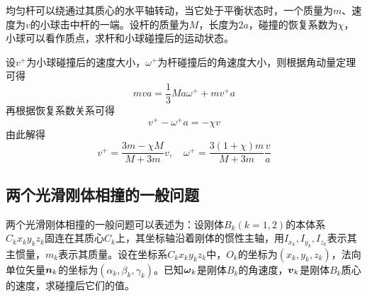 \begin{example}
均匀杆可以绕通过其质心的水平轴转动，当它处于平衡状态时，一个质量为$m$、速度为$v$的小球击中杆的一端。设杆的质量为$M$，长度为$2a$，碰撞的恢复系数为$\chi$，小球可以看作质点，求杆和小球碰撞后的运动状态。
\end{example}
\begin{solution}
设$v^+$为小球碰撞后的速度大小，$\omega^+$为杆碰撞后的角速度大小，则根据角动量定理可得
\begin{equation*}
	mva = \dfrac13Ma\omega^++mv^+a
\end{equation*}
再根据恢复系数关系可得
\begin{equation*}
	v^+-\omega^+a=-\chi v
\end{equation*}
由此解得
\begin{equation*}
	v^+ = \frac{3m-\chi M}{M+3m}v,\quad \omega^+ = \frac{3(1+\chi)m}{M+3m}\frac{v}{a}
\end{equation*}
\end{solution}

\subsection{两个光滑刚体相撞的一般问题}

两个光滑刚体相撞的一般问题可以表述为：设刚体$B_k(k=1,2)$的本体系$C_kx_ky_kz_k$固连在其质心$C_k$上，其坐标轴沿着刚体的惯性主轴，用$I_{x_k},I_{y_k},I_{z_k}$表示其主惯量，$m_k$表示其质量。设在坐标系$C_kx_ky_kz_k$中，$O_k$的坐标为$(x_k,y_k,z_k)$，法向单位矢量$\boldsymbol{n}_k$的坐标为$(\alpha_k,\beta_k,\gamma_k)$。已知$\boldsymbol{\omega}_k$是刚体$B_k$的角速度，$\boldsymbol{v}_k$是刚体$B_k$质心的速度，求碰撞后它们的值。

